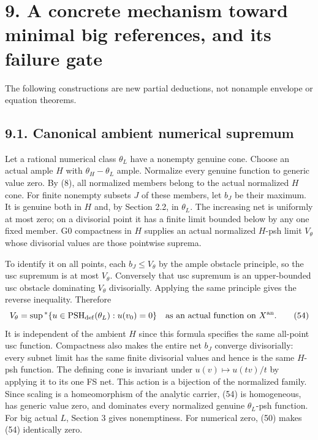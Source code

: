 \documentclass[
  10pt,
]{article}
\begin{document}
\section{9. A concrete mechanism toward minimal big references, and its
failure
gate}\label{a-concrete-mechanism-toward-minimal-big-references-and-its-failure-gate}

The following constructions are new partial deductions, not nonample
envelope or equation theorems.

\subsection{9.1. Canonical ambient numerical
supremum}\label{canonical-ambient-numerical-supremum}

Let a rational numerical class \(\theta_L\) have a nonempty genuine
cone. Choose an actual ample \(H\) with \(\theta_H-\theta_L\) ample.
Normalize every genuine function to generic value zero. By (8), all
normalized members belong to the actual normalized \(H\) cone. For
finite nonempty subsets \(J\) of these members, let \(b_J\) be their
maximum. It is genuine both in \(H\) and, by Section 2.2, in
\(\theta_L\). The increasing net is uniformly at most zero; on a
divisorial point it has a finite limit bounded below by any one fixed
member. G0 compactness in \(H\) supplies an actual normalized \(H\)-psh
limit \(V_\theta\) whose divisorial values are those pointwise suprema.

To identify it on all points, each \(b_J\leq V_\theta\) by the ample
obstacle principle, so the usc supremum is at most \(V_\theta\).
Conversely that usc supremum is an upper-bounded usc obstacle dominating
\(V_\theta\) divisorially. Applying the same principle gives the reverse
inequality. Therefore
\[V_\theta=\sup{}^*\{u\in\operatorname{PSH}_{\rm def}(\theta_L):u(v_0)=0\}
\quad\text{as an actual function on }X^{\rm an}.\tag{54}\] It is
independent of the ambient \(H\) since this formula specifies the same
all-point usc function. Compactness also makes the entire net \(b_J\)
converge divisorially: every subnet limit has the same finite divisorial
values and hence is the same \(H\)-psh function. The defining cone is
invariant under \(u(v)\mapsto u(tv)/t\) by applying it to its one FS
net. This action is a bijection of the normalized family. Since scaling
is a homeomorphism of the analytic carrier, (54) is homogeneous, has
generic value zero, and dominates every normalized genuine
\(\theta_L\)-psh function. For big actual \(L\), Section 3 gives
nonemptiness. For numerical zero, (50) makes (54) identically zero.
\end{document}

